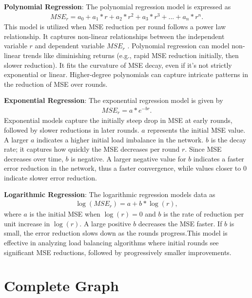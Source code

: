 \textbf{Polynomial Regression}: The polynomial regression model is expressed as
\begin{align}
    MSE_r=a_0+a_1*r+a_2*r^{2}+a_3*r^{3}+...+a_n*r^{n}.    
\end{align}
This model is utilized when MSE reduction per round follows a power law relationship. It captures non-linear relationships between the independent variable $r$ and dependent variable $MSE_r$ \cite{MotulskyDataFitting}. Polynomial regression can model non-linear trends like diminishing returns (e.g., rapid MSE reduction initially, then slower reduction). It fits the curvature of MSE decay, even if it's not strictly exponential or linear. Higher-degree polynomials can capture intricate patterns in the reduction of MSE over rounds.

\textbf{Exponential Regression}: The exponential regression model is given by 
\begin{align}
    MSE_r=a*e^{-br}.    
\end{align}
Exponential models capture the initially steep drop in MSE at early rounds, followed by slower reductions in later rounds. $a$ represents the initial MSE value. A larger $a$ indicates a higher initial load imbalance in the network. $b$ is the decay rate; it captures how quickly the MSE decreases per round $r$. Since MSE decreases over time, $b$ is negative. A larger negative value for $b$ indicates a faster error reduction in the network, thus a faster convergence, while values closer to 0 indicate slower error reduction.

\textbf{Logarithmic Regression}: The logarithmic regression models data as
\begin{align}
    \log{(MSE_r)}=a+b*\log{(r)},    
\end{align}
where $a$ is the initial MSE when $\log{(r)}=0$ and $b$ is the rate of reduction per unit increase in $\log{(r)}$. A large positive $b$ decreases the MSE faster. If $b$ is small, the error reduction slows down as the rounds progress.This model is effective in analyzing load balancing algorithms where initial rounds see significant MSE reductions, followed by progressively smaller improvements.

\section{Complete Graph}\label{sec:completeGraph}

